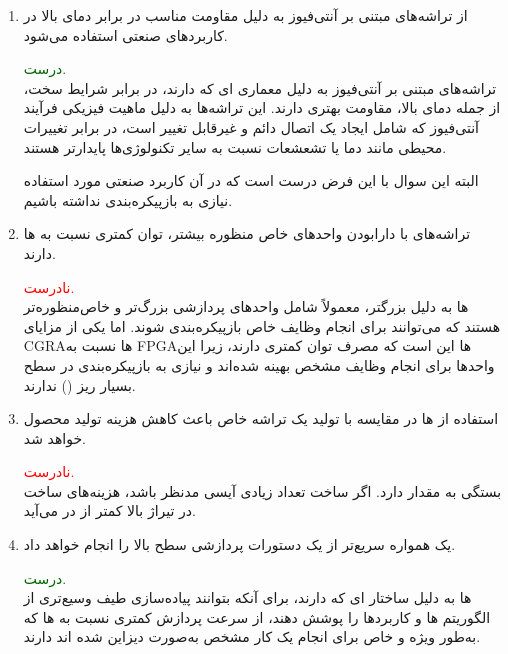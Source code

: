 \begin{enumerate}
	
	
	
	\item 
	از تراشه‌های مبتنی بر آنتی‌فیوز به دلیل مقاومت مناسب در برابر دمای بالا در کاربردهای صنعتی استفاده می‌شود.
	\begin{qsolve}
		\textcolor{darkgreen}{درست.}\\
		تراشه‌های مبتنی بر آنتی‌فیوز به دلیل معماری ای که دارند، در برابر شرایط سخت، از جمله دمای بالا، مقاومت بهتری دارند. این تراشه‌ها به دلیل ماهیت فیزیکی فرآیند آنتی‌فیوز که شامل ایجاد یک اتصال دائم و غیرقابل تغییر است، در برابر تغییرات محیطی مانند دما یا تشعشعات نسبت به سایر تکنولوژی‌ها پایدارتر هستند.
		
		البته این سوال با این فرض درست است که در آن کاربرد صنعتی مورد استفاده نیازی به بازپیکره‌بندی نداشته باشیم.
	\end{qsolve}
	
	
	
	
	\item 
	تراشه‌های  با دارابودن واحدهای خاص منظوره بیشتر، توان کمتری نسبت به ها دارند.
	\begin{qsolve}
		\textcolor{red}{نادرست.}\\
		 ها
		به دلیل  ‌بزرگتر، معمولاً شامل واحدهای پردازشی بزرگ‌تر و خاص‌منظوره‌تر هستند که می‌توانند برای انجام وظایف خاص بازپیکره‌بندی شوند. اما یکی از مزایای CGRAها نسبت به FPGAها این است که مصرف توان کمتری دارند، زیرا این واحدها برای انجام وظایف مشخص بهینه شده‌اند و نیازی به بازپیکره‌بندی در سطح بسیار ریز () ندارند.
		
	\end{qsolve}
	
	
	
	
	\item 
	استفاده از ها در مقایسه با تولید یک تراشه خاص باعث کاهش هزینه تولید محصول خواهد شد.
	\begin{qsolve}
		\textcolor{red}{نادرست.}\\
		بستگی به مقدار  دارد. اگر ساخت تعداد زیادی آیسی مدنظر باشد، هزینه‌های ساخت  در تیراژ بالا کمتر از  در می‌آید.
	
	\end{qsolve}
	
	
	
	
	\item 
	یک  همواره سریع‌تر از یک  دستورات پردازشی سطح بالا را انجام خواهد داد.
	\begin{qsolve}
		\textcolor{darkgreen}{درست.}\\
		\lr{FPGA}
		ها به دلیل ساختار  ای که دارند، برای آنکه بتوانند پیاده‌سازی طیف وسیع‌تری از الگوریتم ها و کاربرد‌ها را پوشش دهند، از سرعت پردازش کمتری نسبت به  ها که به‌طور ویژه و خاص برای انجام یک کار مشخص به‌صورت  دیزاین شده اند دارند.
		

\end{qsolve}
\end{enumerate}
